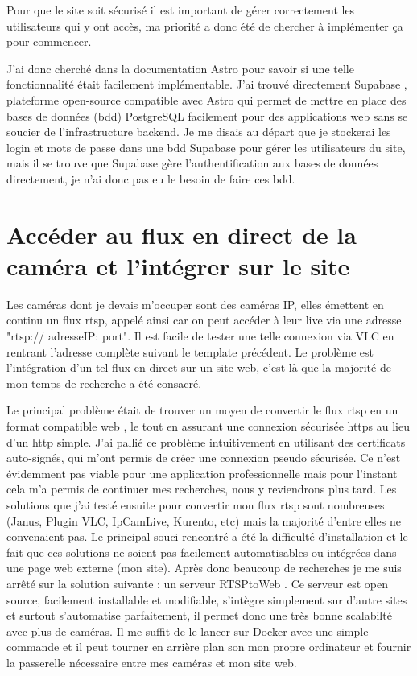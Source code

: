 Pour que le site soit sécurisé il est important de gérer correctement les utilisateurs qui y ont accès, ma priorité a donc été de chercher à implémenter ça pour commencer. 

J'ai donc cherché dans la documentation Astro pour savoir si une telle fonctionnalité était facilement implémentable. J'ai trouvé directement Supabase \cite{supabase}, plateforme open-source compatible avec Astro qui permet de mettre en place des bases de données (\acrshort{bdd}) PostgreSQL facilement pour des applications web sans se soucier de l'infrastructure backend. Je me disais au départ que je stockerai les login et mots de passe dans une \acrshort{bdd} Supabase pour gérer les utilisateurs du site, mais il se trouve que Supabase gère l'authentification aux bases de données directement, je n'ai donc pas eu le besoin de faire ces \acrshort{bdd}.


\section{Accéder au flux en direct de la caméra et l'intégrer sur le site}

Les caméras dont je devais m'occuper sont des caméras IP, elles émettent en continu un flux rtsp, appelé ainsi car on peut accéder à leur live via une adresse "rtsp:// adresseIP: port". Il est facile de tester une telle connexion via VLC en rentrant l'adresse complète suivant le template précédent. Le problème est l'intégration d'un tel flux en direct sur un site web, c'est là que la majorité de mon temps de recherche a été consacré. 

Le principal problème était de trouver un moyen de convertir le flux rtsp en un format compatible web \cite{webrtc}, le tout en assurant une connexion sécurisée https au lieu d'un http simple. J'ai pallié ce problème intuitivement en utilisant des certificats auto-signés, qui m'ont permis de créer une connexion pseudo sécurisée. Ce n'est évidemment pas viable pour une application professionnelle mais pour l'instant cela m'a permis de continuer mes recherches, nous y reviendrons plus tard. Les solutions que j'ai testé ensuite pour convertir mon flux rtsp sont nombreuses (Janus, Plugin VLC, IpCamLive, Kurento, etc) mais la majorité d'entre elles ne convenaient pas. Le principal souci rencontré a été la difficulté d'installation et le fait que ces solutions ne soient pas facilement automatisables ou intégrées dans une page web externe (mon site). Après donc beaucoup de recherches je me suis arrêté sur la solution suivante : un serveur RTSPtoWeb \cite{rtsptoweb}. Ce serveur est open source, facilement installable et modifiable, s'intègre simplement sur d'autre sites et surtout s'automatise parfaitement, il permet donc une très bonne scalabilté avec plus de caméras. Il me suffit de le lancer sur Docker avec une simple commande et il peut tourner en arrière plan son mon propre ordinateur et fournir la passerelle nécessaire entre mes caméras et mon site web.

